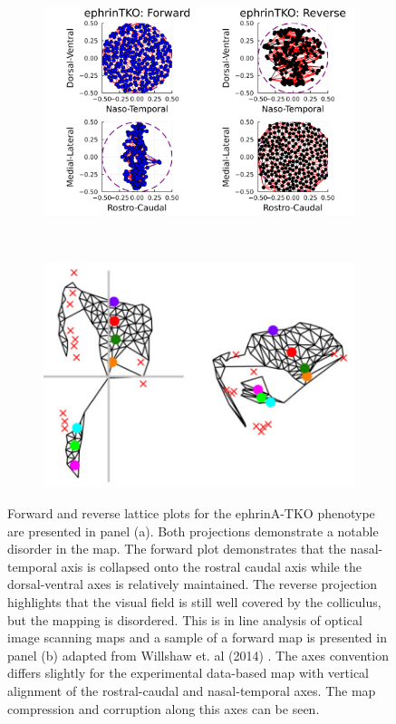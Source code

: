 \begin{figure}
	\begin{subfigure}{0.7\textwidth}
		\centering
		\includegraphics[width=\textwidth]{images/distributed_kernels/figure_lattice_ephrinTKO}
		\caption{}
	\end{subfigure}
~
	\begin{subfigure}{0.26\textwidth}
	\centering
	\includegraphics[width=\textwidth]{images/distributed_kernels/latticeephrinTKO}	
	\caption{}
	\end{subfigure}
	\def\c{Forward and reverse lattice plots for the ephrinA-TKO phenotype are presented. }
	\caption[\c]{\label{fig:ephrina2a5_lattice} Forward and reverse lattice plots for the ephrinA-TKO phenotype are presented in panel (a). Both projections demonstrate a notable disorder in the map. The forward plot demonstrates that the nasal-temporal axis is collapsed onto the rostral caudal axis while the dorsal-ventral axes is relatively maintained. The reverse projection highlights that the visual field is still well covered by the colliculus, but the mapping is disordered. This is in line analysis of optical image scanning maps and a sample of a forward map is presented in panel (b) adapted from Willshaw et. al (2014) \cite{Willshaw2014-ms}. The axes convention differs slightly for the experimental data-based map with vertical alignment of the rostral-caudal and nasal-temporal axes. The map compression and corruption along this axes can be seen.}
\end{figure}
\newpage
